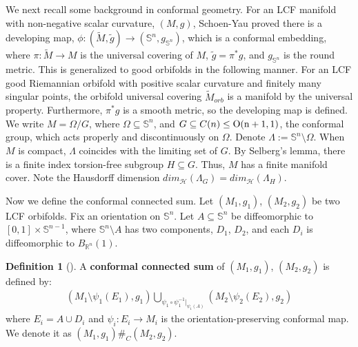 \documentclass[12pt]{amsart}
\theoremstyle{definition}
\newtheorem{definition}[theorem]{Definition}
\begin{document}
We next recall some background in conformal geometry. For an LCF manifold with non-negative scalar curvature, $(M,g)$, Schoen-Yau \cite{SYconformal} proved there is a developing map, $\phi:(\tilde{M},\tilde{g})\to (\mathbb{S}^n, g_{\mathbb{S}^n})$, which is a conformal embedding, where $\pi:\tilde{M}\to M$ is the universal covering of $M$, $\tilde{g} = \pi^*g$, and $g_{\mathbb{S}^n}$ is the round metric. This is generalized to good orbifolds in the following manner. 
For an LCF good Riemannian orbifold with positive scalar curvature and finitely many singular points, the orbifold universal covering $\tilde{M}_{orb}$ is a manifold by the universal property. Furthermore, $\pi^* g$ is a smooth metric, so the developing map is defined.
We write $M = \Omega/G$, where $\Omega\subseteq \mathbb{S}^n$, and $G\subseteq C(n) \leq \rm{O}(n+1,1)$, the conformal group, which acts properly and discontinuously on $\Omega$. Denote $\Lambda := \mathbb{S}^n\setminus\Omega$. When $M$ is compact, $\Lambda$ coincides with the limiting set of $G$. By Selberg's lemma, there is a finite index torsion-free subgroup $H\subseteq G$. Thus, $M$ has a finite manifold cover. Note the Hausdorff dimension $dim_\mathcal{H}(\Lambda_G) = dim_\mathcal{H}(\Lambda_H)$.

Now we define the conformal connected sum. Let $(M_1,g_1)$, $(M_2,g_2)$ be two LCF orbifolds. Fix an orientation on $\mathbb{S}^n$. Let $A\subseteq \mathbb{S}^n$ be diffeomorphic to $[0,1]\times\mathbb{S}^{n-1}$, where $\mathbb{S}^n\setminus A$ has two components, $D_1$, $D_2$, and each $D_i$ is diffeomorphic to $B_{\mathbb{R}^n}(1)$.

\begin{definition}[\cite{Iz1}]\label{conformal connected sum}
    A \textbf{conformal connected sum} of $(M_1,g_1)$, $(M_2,g_2)$ is defined by:
    \begin{align*}
        (M_1 \setminus \psi_1(E_1), g_1)\bigcup_{\psi_1\circ\psi_1^{-1}|_{\psi_1(A)}}(M_2 \setminus \psi_2(E_2), g_2)
    \end{align*}
    where $E_i = A\cup D_i$ and $\psi_i: E_i \to M_i$ is the orientation-preserving conformal map. We denote it as $(M_1,g_1)\#_C(M_2,g_2)$.
\end{definition}
\end{document}
